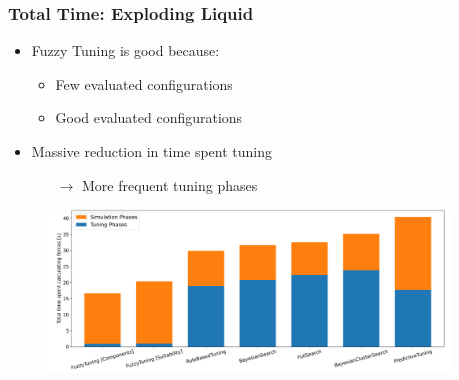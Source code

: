 \documentclass[
	10pt,
	t		%
]{beamer}
\begin{document}
\begin{frame}
	\frametitle{Total Time: Exploding Liquid}
	\begin{itemize}
		\item Fuzzy Tuning is good because:
		      \begin{itemize}
			      \item Few evaluated configurations
			      \item Good evaluated configurations
		      \end{itemize}
		\item Massive reduction in time spent tuning
		      \begin{itemize}
			      \item[$\rightarrow$] More frequent tuning phases
		      \end{itemize}
	\end{itemize}
	
	\begin{figure}
		\centering
		\includegraphics[width=0.95\textwidth]{figures/exploding-liquid-total.png}
	\end{figure}
\end{frame}
\end{document}
